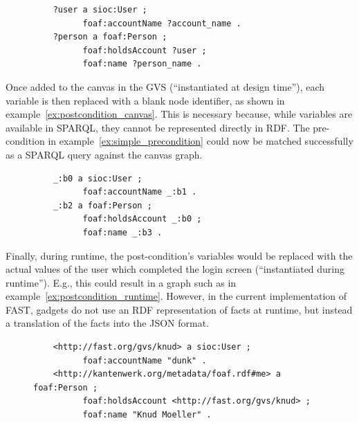 \documentclass[twoside]{fast_latex}
\begin{document}
\singlespacing
{}
\begin{figure}
\begin{lstlisting}
	?user a sioc:User ;
	      foaf:accountName ?account_name .
	?person a foaf:Person ;
	      foaf:holdsAccount ?user ;
	      foaf:name ?person_name .
\end{lstlisting}
\end{figure}
\doublespacing

Once added to the canvas in the GVS (``instantiated at design time''), each variable is then replaced with a blank node identifier, as shown in example~\ref{ex:postcondition_canvas}. This is necessary because, while variables are available in SPARQL, they cannot be represented directly in RDF. The pre-condition in example~\ref{ex:simple_precondition} could now be matched successfully as a SPARQL query against the canvas graph.

\singlespacing
{}
\begin{figure}
\begin{lstlisting}
	_:b0 a sioc:User ;
	      foaf:accountName _:b1 .
	_:b2 a foaf:Person ;
	      foaf:holdsAccount _:b0 ;
	      foaf:name _:b3 .
\end{lstlisting}
\end{figure}
\doublespacing

Finally, during runtime, the post-condition's variables would be replaced with the actual values of the user which completed the login screen (``instantiated during runtime''). E.g., this could result in a graph such as in example~\ref{ex:postcondition_runtime}. However, in the current implementation of FAST, gadgets do not use an RDF representation of facts at runtime, but instead a translation of the facts into the JSON format.

\singlespacing
{}
\begin{figure}
\begin{lstlisting}
	<http://fast.org/gvs/knud> a sioc:User ;
	      foaf:accountName "dunk" .
	<http://kantenwerk.org/metadata/foaf.rdf#me> a foaf:Person ;
	      foaf:holdsAccount <http://fast.org/gvs/knud> ;
	      foaf:name "Knud Moeller" .
\end{lstlisting}
\end{figure}
\doublespacing
\end{document}
